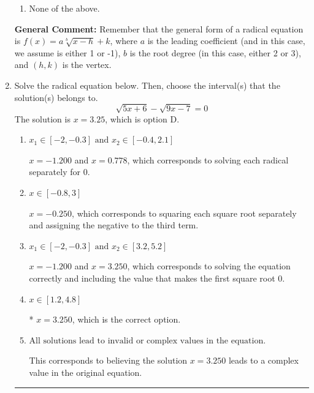 \documentclass{extbook}[14pt]
\newcommand{\litem}[1]{\item #1

\rule{\textwidth}{0.4pt}}
\begin{document}
\begin{enumerate}
{\begin{enumerate}[label=\Alph*.]
\begin{multicols}{2}
\end{multicols}\item None of the above.\end{enumerate}
\textbf{General Comment:} Remember that the general form of a radical equation is $ f(x) = a \sqrt[b]{x - h} + k $, where $a$ is the leading coefficient (and in this case, we assume is either 1 or -1), $b$ is the root degree (in this case, either 2 or 3), and $(h, k)$ is the vertex.
}
\litem{
Solve the radical equation below. Then, choose the interval(s) that the solution(s) belongs to.
\[ \sqrt{5 x + 6} - \sqrt{9 x - 7} = 0 \]The solution is \( x = 3.25 \), which is option D.\begin{enumerate}[label=\Alph*.]
\item \( x_1 \in [-2, -0.3] \text{ and } x_2 \in [-0.4,2.1] \)

$x = -1.200$ and $x = 0.778$, which corresponds to solving each radical separately for 0.
\item \( x \in [-0.8,3] \)

$x = -0.250$, which corresponds to squaring each square root separately and assigning the negative to the third term.
\item \( x_1 \in [-2, -0.3] \text{ and } x_2 \in [3.2,5.2] \)

$x = -1.200$ and $x = 3.250$, which corresponds to solving the equation correctly and including the value that makes the first square root 0.
\item \( x \in [1.2,4.8] \)

* $x = 3.250$, which is the correct option.
\item \( \text{All solutions lead to invalid or complex values in the equation.} \)

This corresponds to believing the solution $x = 3.250$ leads to a complex value in the original equation.
\end{enumerate}

}
\end{enumerate}
\end{document}
